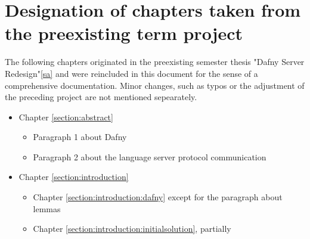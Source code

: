 \section{Designation of chapters taken from the preexisting term project}
The following chapters originated in the preexisting semester thesis "Dafny Server Redesign"\ref{sa} and were reincluded in this document for the sense of a comprehensive documentation. Minor changes, such as typos or the adjustment of the preceding project are not mentioned sepearately.
\begin{itemize}
    \item Chapter \ref{section:abstract}
        \begin{itemize}
            \item Paragraph 1 about Dafny
            \item Paragraph 2 about the language server protocol communication
        \end{itemize}
    \item Chapter \ref{section:introduction}
        \begin{itemize}
            \item Chapter \ref{section:introduction:dafny} except for the paragraph about lemmas
            \item Chapter \ref{section:introduction:initialsolution}, partially
        \end{itemize}

\end{itemize}